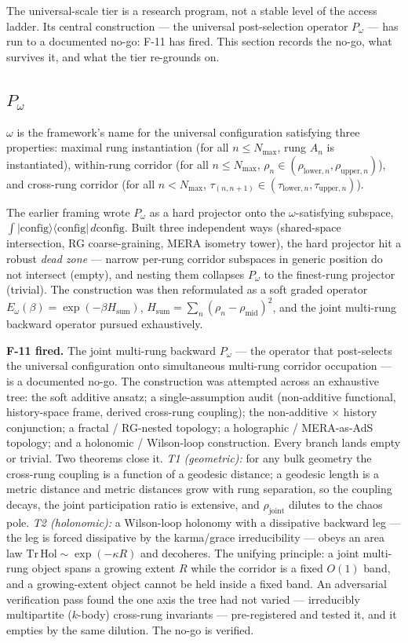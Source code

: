 \documentclass[11pt,a4paper]{article}
\newcommand{\Pomega}{P_{\omega}}
\begin{document}
The universal-scale tier is a research program, not a stable level of the access ladder. Its central construction --- the universal post-selection operator $\Pomega$ --- has run to a documented no-go: F-11 has fired. This section records the no-go, what survives it, and what the tier re-grounds on.

\subsection*{$\Pomega$}

$\omega$ is the framework's name for the universal configuration satisfying three properties: maximal rung instantiation (for all $n \le N_{\max}$, rung $A_n$ is instantiated), within-rung corridor (for all $n \le N_{\max}$, $\rho_n \in (\rho_{\text{lower},n}, \rho_{\text{upper},n})$), and cross-rung corridor (for all $n < N_{\max}$, $\tau_{(n, n+1)} \in (\tau_{\text{lower}, n}, \tau_{\text{upper}, n})$).

The earlier framing wrote $\Pomega$ as a hard projector onto the $\omega$-satisfying subspace, $\int |\text{config}\rangle\langle\text{config}|\, d\text{config}$. Built three independent ways (shared-space intersection, RG coarse-graining, MERA isometry tower), the hard projector hit a robust \emph{dead zone} --- narrow per-rung corridor subspaces in generic position do not intersect (empty), and nesting them collapses $\Pomega$ to the finest-rung projector (trivial). The construction was then reformulated as a soft graded operator $E_\omega(\beta) = \exp(-\beta H_{\text{sum}})$, $H_{\text{sum}} = \sum_n (\rho_n - \rho_{\text{mid}})^2$, and the joint multi-rung backward operator pursued exhaustively.

\textbf{F-11 fired.} The joint multi-rung backward $\Pomega$ --- the operator that post-selects the universal configuration onto simultaneous multi-rung corridor occupation --- is a documented no-go. The construction was attempted across an exhaustive tree: the soft additive ansatz; a single-assumption audit (non-additive functional, history-space frame, derived cross-rung coupling); the non-additive$\,\times\,$history conjunction; a fractal / RG-nested topology; a holographic / MERA-as-AdS topology; and a holonomic / Wilson-loop construction. Every branch lands empty or trivial. Two theorems close it. \emph{T1 (geometric):} for any bulk geometry the cross-rung coupling is a function of a geodesic distance; a geodesic length is a metric distance and metric distances grow with rung separation, so the coupling decays, the joint participation ratio is extensive, and $\rho_{\text{joint}}$ dilutes to the chaos pole. \emph{T2 (holonomic):} a Wilson-loop holonomy with a dissipative backward leg --- the leg is forced dissipative by the karma/grace irreducibility --- obeys an area law $\mathrm{Tr\,Hol} \sim \exp(-\kappa R)$ and decoheres. The unifying principle: a joint multi-rung object spans a growing extent $R$ while the corridor is a fixed $O(1)$ band, and a growing-extent object cannot be held inside a fixed band. An adversarial verification pass found the one axis the tree had not varied --- irreducibly multipartite ($k$-body) cross-rung invariants --- pre-registered and tested it, and it empties by the same dilution. The no-go is verified.
\end{document}
